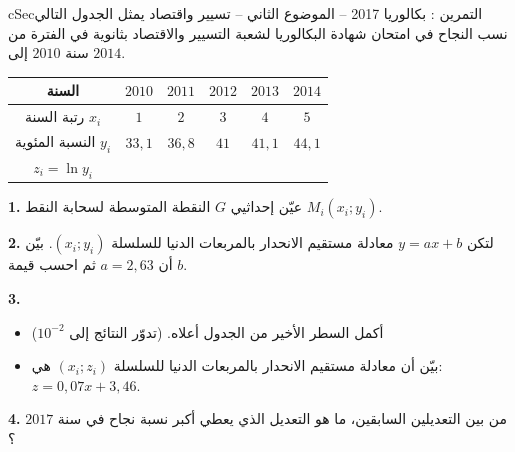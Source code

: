 \documentclass[12pt,a4paper]{article}
\newenvironment{BOX}[2]{\begin{otherlanguage}{english}\begin{arbox}{#1}{#2}}{\end{arbox}\end{otherlanguage}}
\newcounter{exo}
\newenvironment{tamrin}[1]{\stepcounter{exo}\begin{BOX}{cSec}{التمرين \theexo: #1}}{\end{BOX}}
\newenvironment{sq}{\begin{itemize}[leftmargin=2.4em,itemsep=3pt]}{\end{itemize}}
\newcommand{\qa}{\item[(أ)]}\newcommand{\qb}{\item[(ب)]}\newcommand{\qc}{\item[(جـ)]}\newcommand{\qd}{\item[(د)]}\newcommand{\qe}{\item[(هـ)]}
\newcommand{\QQ}[1]{\par\smallskip\textbf{#1.} }
\begin{document}
\begin{tamrin}{بكالوريا 2017 -- الموضوع الثاني -- تسيير واقتصاد}
يمثل الجدول التالي نسب النجاح في امتحان شهادة البكالوريا لشعبة التسيير والاقتصاد بثانوية في الفترة من سنة $2010$ إلى $2014$.
\begin{center}
\begin{tabular}{|C|c|c|c|c|c|}\hline
{} السنة & $2010$ & $2011$ & $2012$ & $2013$ & $2014$\\\hline
رتبة السنة $x_i$ & $1$ & $2$ & $3$ & $4$ & $5$\\\hline
النسبة المئوية $y_i$ & $33{,}1$ & $36{,}8$ & $41$ & $41{,}1$ & $44{,}1$\\\hline
$z_i=\ln y_i$ &  &  &  &  & \\\hline
\end{tabular}
\end{center}

\QQ{1} عيّن إحداثيي $G$ النقطة المتوسطة لسحابة النقط $M_i(x_i;y_i)$.
\QQ{2} لتكن $y=ax+b$ معادلة مستقيم الانحدار بالمربعات الدنيا للسلسلة $(x_i;y_i)$. بيّن أن $a=2{,}63$ ثم احسب قيمة $b$.
\QQ{3}
\begin{sq}
\qa أكمل السطر الأخير من الجدول أعلاه. (تدوّر النتائج إلى $10^{-2}$)
\qb بيّن أن معادلة مستقيم الانحدار بالمربعات الدنيا للسلسلة $(x_i;z_i)$ هي: $z=0{,}07x+3{,}46$.
\end{sq}
\QQ{4} من بين التعديلين السابقين، ما هو التعديل الذي يعطي أكبر نسبة نجاح في سنة $2017$؟
\end{tamrin}
\Needspace{14cm}
\end{document}
